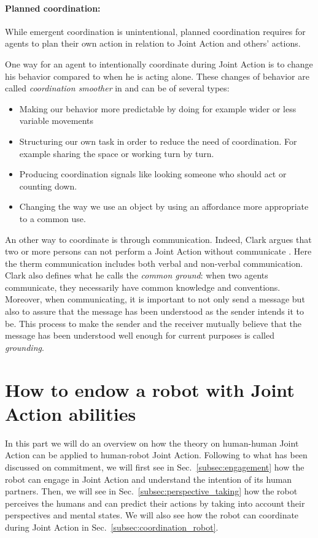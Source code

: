 \documentclass[english,a4paper,11pt,twoside]{StyleThese}
\begin{document}
\paragraph{Planned coordination:} 
While emergent coordination is unintentional, planned coordination requires for agents to plan their own action in relation to Joint Action and others' actions.

One way for an agent to intentionally coordinate during Joint Action is to change his behavior compared to when he is acting alone. These changes of behavior are called \textit{coordination smoother} in \cite{vesper2010minimal} and can be of several types:
\begin{itemize}
\item Making our behavior more predictable by doing for example wider or less variable movements
\item Structuring our own task in order to reduce the need of coordination. For example sharing the space or working turn by turn.
\item Producing coordination signals like looking someone who should act or counting down.
\item Changing the way we use an object by using an affordance more appropriate to a common use.
\end{itemize}

An other way to coordinate is through communication. Indeed, Clark argues that two or more persons can not perform a Joint Action without communicate \cite{clark1996using}. Here the therm communication includes both verbal and non-verbal communication. Clark also defines what he calls the \textit{common ground}: when two agents communicate, they necessarily have common knowledge and conventions. Moreover, when communicating, it is important to not only send a message but also to assure that the message has been understood as the sender intends it to be. This process to make the sender and the receiver mutually believe that the message has been understood well enough for current purposes is called \textit{grounding}.


\section{How to endow a robot with Joint Action abilities}

In this part we will do an overview on how the theory on human-human Joint Action can be applied to human-robot Joint Action. Following to what has been discussed on commitment, we will first see in Sec.~\ref{subsec:engagement} how the robot can engage in Joint Action and understand the intention of its human partners. Then, we will see in Sec.~\ref{subsec:perspective_taking} how the robot perceives the humans and can predict their actions by taking into account their perspectives and mental states. We will also see how the robot can coordinate during Joint Action in Sec.~\ref{subsec:coordination_robot}.
\end{document}
